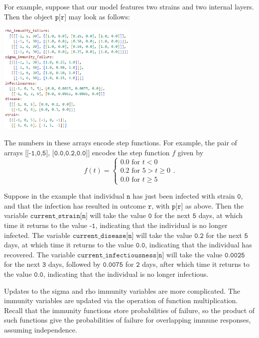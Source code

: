 \documentclass[10pt,letterpaper]{article}
\begin{document}
For example, suppose that our model features two strains and two internal layers. Then the object $\texttt{p[r]}$ may look as follows:
\begin{center}
\includegraphics[width=0.5\textwidth]{codeexample}
\end{center}
The numbers in these arrays encode step functions. For example, the pair of arrays $\texttt{[[-1,0,5], [0.0,0.2,0.0]]}$ encodes the step function $f$ given by
\begin{equation}
f(t) =
\begin{cases}
0.0 \text{ for } t < 0 \\
0.2 \text{ for } 5 > t \geq 0 \\
0.0 \text{ for } t \geq 5
\end{cases}.
\end{equation}

Suppose in the example that individual $\texttt{n}$ has just been infected with strain $\texttt{0}$, and that the infection has resulted in outcome $\texttt{r}$, with $\texttt{p[r]}$ as above. Then the variable $\texttt{current{\_}strain[n]}$ will take the value $\texttt{0}$ for the next $\texttt{5}$ days, at which time it returns to the value $\texttt{-1}$, indicating that the individual is no longer infected. The variable $\texttt{current{\_}disease[n]}$ will take the value $\texttt{0.2}$ for the next $\texttt{5}$ days, at which time it returns to the value $\texttt{0.0}$, indicating that the individual has recovered. The variable $\texttt{current{\_}infectiousness[n]}$ will take the value $\texttt{0.0025}$ for the next $\texttt{3}$ days, followed by $\texttt{0.0075}$ for $\texttt{2}$ days, after which time it returns to the value $\texttt{0.0}$, indicating that the individual is no longer infectious.

Updates to the sigma and rho immunity variables are more complicated. The immunity variables are updated via the operation of function multiplication. Recall that the immunity functions store probabilities of failure, so the product of such functions give the probabilities of failure for overlapping immune responses, assuming independence.
\end{document}
